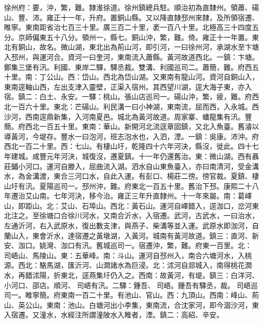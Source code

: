 \begin{pinyinscope}
徐州府：要，沖，繁，難。隸淮徐道。徐州鎮總兵駐。順治初為直隸州。領蕭、碭山、豐、沛。雍正十一年，升府。置銅山縣。又以降直隸邳州來隸，及所領宿遷、睢寧。東南距省治七百三十里。廣三百二十里，袤一百八十里。北極高三十四度五分。京師偏東五十八分。領州一，縣七。銅山沖，繁，難。倚。雍正十一年置。東北有銅山，故名。微山湖，東北出為荊山河，即引河，一曰徐州河，承湖水至卞塘入邳州，與運河合。資河一曰奎河，東南流入蕭縣。黃河故道西北。一鎮：卞塘。鄭集三堡有汛。利國、東岸二驛，驛丞裁。雙溝、利國巡司二。蕭簡，難。府西五十里。南：丁公山。西：岱山。西北為岱山湖。又東南有龍山河。資河自銅山入，東南逕軸山西，左出支津入靈壁，正渠入宿州。其西望川湖，逕大海子東，亦入宿。鎮二：白土、永安。一驛：桃山。張山店巡司一。碭山沖，繁，疲，難。府西北一百六十里。東北：芒碭山。利民溝一曰小神湖，東南流，屈而西，入永城。西沙河，西南逕鼎新集，入河南夏邑。城北為黃河故道。周家寨、蟠龍集有汛。豐簡。府西北一百五十里。東南：華山。新開河北流逕章固鎮，又北入魚臺。舊濬以導黃河，今堤存。豐水一曰泡河，班志泡水也，入泗，湮。一鎮：吳康。沛沖。府西北一百二十里。西：七山。有棲山圩，乾隆四十六年河決，縣沒，徙此。四十七年建城。咸豐元年河決，城復沒，遷夏鎮。十一年仍還舊治。東：微山湖。西有聶莊鋪小河口。運河自滕入，屈曲流入湖。泗水自山東魚臺入，亦曰南清河，受金溝水，為金溝渡，東合三河口水，自此入運。有彭口、楊莊二徬。徬官裁。夏鎮、棲山圩有汛。夏陽巡司一。邳州沖，難。府東北一百五十里。舊治下邳。康熙二十八年遷治艾山南。七年河決，移今治。雍正三年升直隸州。十一年來屬。南：葛嶧山，即距山。北：艾山、石埠山。西北：黃石山。運河自嶧錯入，逕泇口，岔河東北注之。至徐塘口合徐川河水，又南合沂水，入宿遷。武河，古武水，一曰治水，左通沂河，右入武原水，復出數支津，與燕子、柴溝等並入運。武原水即泇河，自蘭山入，東會沂水，達宿遷之黃墩湖，入黃河。城南有黃河故道。鎮三：直河、新安、泇口。姚灣、泇口有汛。舊城巡司一。宿遷沖，繁，難。府東一百里。北：司峿山、馬陵山。東：五華峰。南：斗山。運河自邳州入，南合六塘河水，入桃源。西北：駱馬湖，匯沂河、山澗諸水為巨浸。北：沭河自郯城入，南得桃花澗水，再錯沭陽，折東北，逕燕集圩仍入之。西南：故黃河，有堤。鎮三：白洋河、小河口、邵店。順河、司峿有汛。二驛：鍾吾、司峿。鍾吾有驛丞，裁。司峿巡司一。睢寧簡。府東南一百二十里。有池山、官山。西：九頂山。西南：峰山、荊山、英公山。東南：池山。白塘河出小李集，東南流，合沈家河，即今涸沙河，東入宿遷。又潼水，水經注所謂潼陂水入睢者，湮。鎮二：高紹、辛安。


\end{pinyinscope}
